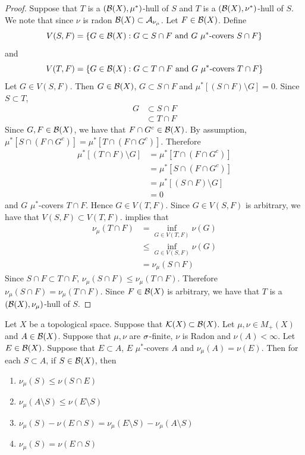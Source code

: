 \documentclass{book}
\begin{document}
	\begin{proof}
		Suppose that $T$ is a $(\mathcal{B}(X), \mu^*)$-hull of $S$ and $T$ is a $(\mathcal{B}(X), \nu^*)$-hull of $S$. We note that since $\nu$ is radon $\mathcal{B}(X) \subset \mathcal{A}_{\nu_{\mu}}$. Let $F \in \mathcal{B}(X)$. Define 
		$$V(S, F) = \{G \in \mathcal{B}(X): G \subset S \cap F \text{ and $G$ $\mu^*$-covers $S \cap F$} \}$$ and 
		$$V(T, F) = \{G \in \mathcal{B}(X): G \subset T \cap F \text{ and $G$ $\mu^*$-covers $T \cap F$} \}$$
		Let $G \in V(S,F)$. Then $G \in \mathcal{B}(X)$, $G \subset S \cap F $ and $\mu^*[(S \cap F) \setminus G] = 0$. Since $S \subset T$, 
		\begin{align*}
			G 
			& \subset S \cap F \\
			& \subset T \cap F
		\end{align*} 
		Since $G, F \in \mathcal{B}(X)$, we have that $F \cap G^c \in \mathcal{B}(X)$. By assumption, $\mu^*[S \cap (F \cap G^c)] = \mu^*[T \cap (F \cap G^c)]$. Therefore
		\begin{align*}
			\mu^*[(T \cap F) \setminus G]
			& = \mu^*[T \cap (F \cap G^c)] \\
			& = \mu^*[S \cap (F \cap G^c)] \\
			& = \mu^*[(S \cap F) \setminus G] \\
			& = 0
		\end{align*}
		and $G$ $\mu^*$-covers $T \cap F$. Hence $G \in V(T, F)$. Since $G \in V(S, F)$ is arbitrary, we have that $ V(S, F) \subset  V(T, F)$.  implies that 
		\begin{align*}
			\nu_{\mu}(T \cap F)
			& = \inf\limits_{G \in V(T, F)} \nu(G) \\
			& \leq \inf\limits_{G \in V(S, F)} \nu(G) \\ 
			& = \nu_{\mu}(S \cap F)
		\end{align*}
		Since $S \cap F \subset T \cap F$, $\nu_{\mu}(S \cap F) \leq \nu_{\mu}(T \cap F)$. Therefore $\nu_{\mu}(S \cap F) = \nu_{\mu}(T \cap F)$. Since $F \in \mathcal{B}(X)$ is arbitrary, we have that $T$ is a $(\mathcal{B}(X), \nu_{\mu})$-hull of $S$. 
	\end{proof}

	\begin{ex} 
		Let $X$ be a topological space. Suppose that $\mathcal{K}(X) \subset \mathcal{B}(X)$. Let $\mu, \nu \in M_+(X)$ and $A \in \mathcal{B}(X)$. Suppose that $\mu,\nu$ are $\sigma$-finite, $\nu$ is Radon and $\nu(A) < \infty$. Let $E \in \mathcal{B}(X)$. Suppose that $E \subset A$, $E$ $\mu^*$-covers $A$ and $\nu_{\mu}(A) = \nu(E)$. Then for each $S \subset A$, if $S \in \mathcal{B}(X)$, then
		\begin{enumerate}
			\item $\nu_{\mu}(S) \leq \nu(S \cap E)$ 
			\item $\nu_{\mu}(A \setminus S) \leq \nu(E \setminus S)$
			\item $\nu_{\mu}(S) - \nu(E \cap S) = \nu_{\mu}(E \setminus S) - \nu_{\mu}(A \setminus S)$
			\item $\nu_{\mu}(S) = \nu(E \cap S)$
		\end{enumerate} 
	\end{ex}
\end{document}
